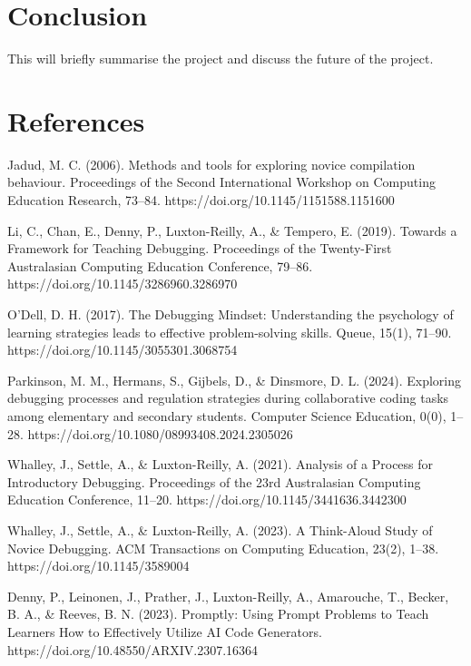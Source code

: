 \documentclass[12pt]{extarticle}
\begin{document}
\section{Conclusion}

This will briefly summarise the project and discuss the future of the project.

\newpage
\section{References}
\begin{thebibliography}{9}

Jadud, M. C. (2006). Methods and tools for exploring novice compilation behaviour. Proceedings of the Second International Workshop on Computing Education Research, 73–84. https://doi.org/10.1145/1151588.1151600

Li, C., Chan, E., Denny, P., Luxton-Reilly, A., \& Tempero, E. (2019). Towards a Framework for Teaching Debugging. Proceedings of the Twenty-First Australasian Computing Education Conference, 79–86. https://doi.org/10.1145/3286960.3286970

O’Dell, D. H. (2017). The Debugging Mindset: Understanding the psychology of learning strategies leads to effective problem-solving skills. Queue, 15(1), 71–90. https://doi.org/10.1145/3055301.3068754

Parkinson, M. M., Hermans, S., Gijbels, D., \& Dinsmore, D. L. (2024). Exploring debugging processes and regulation strategies during collaborative coding tasks among elementary and secondary students. Computer Science Education, 0(0), 1–28. https://doi.org/10.1080/08993408.2024.2305026

Whalley, J., Settle, A., \& Luxton-Reilly, A. (2021). Analysis of a Process for Introductory Debugging. Proceedings of the 23rd Australasian Computing Education Conference, 11–20. https://doi.org/10.1145/3441636.3442300

Whalley, J., Settle, A., \& Luxton-Reilly, A. (2023). A Think-Aloud Study of Novice Debugging. ACM Transactions on Computing Education, 23(2), 1–38. https://doi.org/10.1145/3589004

Denny, P., Leinonen, J., Prather, J., Luxton-Reilly, A., Amarouche, T., Becker, B. A., \& Reeves, B. N. (2023). Promptly: Using Prompt Problems to Teach Learners How to Effectively Utilize AI Code Generators. https://doi.org/10.48550/ARXIV.2307.16364


\end{thebibliography}
\end{document}
